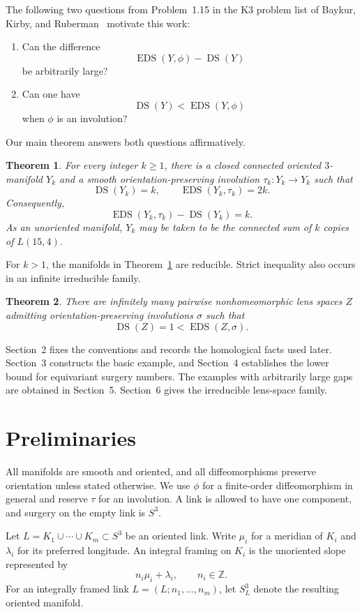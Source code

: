 \documentclass[11pt]{amsart}
\newcommand{\DS}{\operatorname{DS}}
\newcommand{\EDS}{\operatorname{EDS}}
\newcommand{\Z}{\mathbb{Z}}
\newtheorem{theorem}{Theorem}[section]
\theoremstyle{definition}
\theoremstyle{remark}
\begin{document}
The following two questions from Problem~1.15 in the K3 problem list of Baykur, Kirby, and Ruberman~\cite{K3} motivate this work:
\begin{enumerate}
\item[(b)] Can the difference
\[
   \EDS(Y,\phi)-\DS(Y)
\]
be arbitrarily large?

\item[(c)] Can one have
\[
   \DS(Y)<\EDS(Y,\phi)
\]
when $\phi$ is an involution?
\end{enumerate}
Our main theorem answers both questions affirmatively.

\begin{theorem}\label{thm:main}
For every integer $k\geq 1$, there is a closed connected oriented $3$-manifold $Y_k$ and a smooth orientation-preserving involution $\tau_k\colon Y_k\to Y_k$ such that
\[
   \DS(Y_k)=k,
   \qquad
   \EDS(Y_k,\tau_k)=2k.
\]
Consequently,
\[
   \EDS(Y_k,\tau_k)-\DS(Y_k)=k.
\]
As an unoriented manifold, $Y_k$ may be taken to be the connected sum of $k$ copies of $L(15,4)$.
\end{theorem}

For $k>1$, the manifolds in Theorem~\ref{thm:main} are reducible. Strict inequality also occurs in an infinite irreducible family.

\begin{theorem}\label{thm:irreducible}
There are infinitely many pairwise nonhomeomorphic lens spaces $Z$ admitting orientation-preserving involutions $\sigma$ such that
\[
   \DS(Z)=1<\EDS(Z,\sigma).
\]
\end{theorem}

Section~2 fixes the conventions and records the homological facts used later. Section~3 constructs the basic example, and Section~4 establishes the lower bound for equivariant surgery numbers. The examples with arbitrarily large gaps are obtained in Section~5. Section~6 gives the irreducible lens-space family.

\section{Preliminaries}

All manifolds are smooth and oriented, and all diffeomorphisms preserve orientation unless stated otherwise. We use $\phi$ for a finite-order diffeomorphism in general and reserve $\tau$ for an involution. A link is allowed to have one component, and surgery on the empty link is $S^3$.

Let $L=K_1\cup\cdots\cup K_m\subset S^3$ be an oriented link. Write $\mu_i$ for a meridian of $K_i$ and $\lambda_i$ for its preferred longitude. An integral framing on $K_i$ is the unoriented slope represented by
\[
   n_i\mu_i+\lambda_i,
   \qquad n_i\in\Z.
\]
For an integrally framed link $L=(L;n_1,\dots,n_m)$, let $S^3_L$ denote the resulting oriented manifold.
\end{document}
